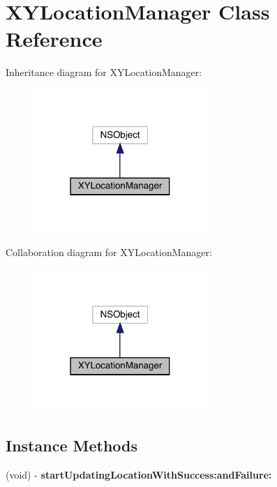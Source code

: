 \hypertarget{interface_x_y_location_manager}{}\section{X\+Y\+Location\+Manager Class Reference}
\label{interface_x_y_location_manager}


Inheritance diagram for X\+Y\+Location\+Manager\+:\nopagebreak
\begin{figure}[H]
\begin{center}
\leavevmode
\includegraphics[width=187pt]{interface_x_y_location_manager__inherit__graph}
\end{center}
\end{figure}


Collaboration diagram for X\+Y\+Location\+Manager\+:\nopagebreak
\begin{figure}[H]
\begin{center}
\leavevmode
\includegraphics[width=187pt]{interface_x_y_location_manager__coll__graph}
\end{center}
\end{figure}
\subsection*{Instance Methods}
\begin{DoxyCompactItemize}
\item 
\mbox{\label{interface_x_y_location_manager_acbaab0d35f6deb8bd1ed251b36e7796e}} 
(void) -\/ {\bfseries start\+Updating\+Location\+With\+Success\+:and\+Failure\+:}
\end{DoxyCompactItemize}
